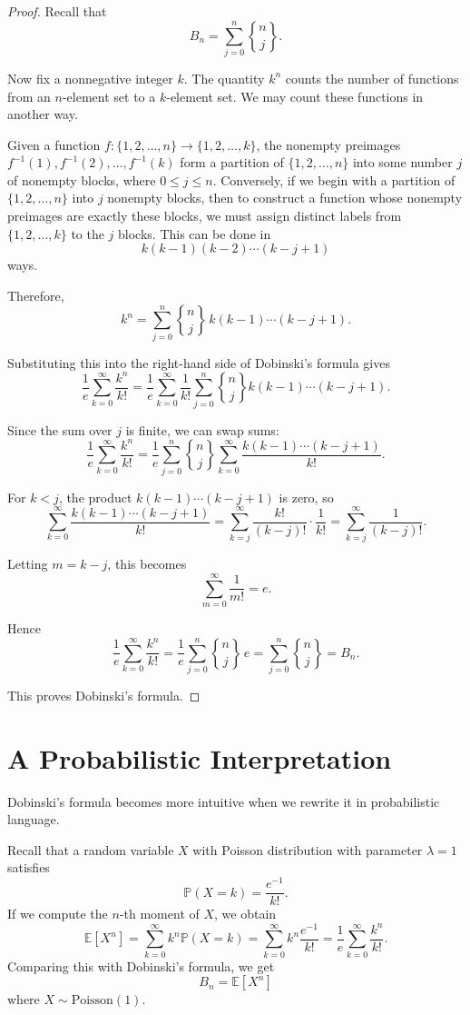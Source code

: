 \documentclass[12pt]{amsart}
\theoremstyle{plain}
\theoremstyle{definition}
\theoremstyle{remark}
\newcommand{\PP}{\mathbb{P}}
\newcommand{\EE}{\mathbb{E}}
\begin{document}
\begin{proof}
Recall that
$$B_n = \sum_{j = 0}^n {n \brace j}.$$

Now fix a nonnegative integer $k$. The quantity $k^n$ counts the number of functions from an $n$-element set to a $k$-element set. We may count these functions in another way.

Given a function $f : \{1, 2, \dots, n\} \to \{1, 2, \dots, k\}$, the nonempty preimages $f^{-1}(1), f^{-1}(2), \dots, f^{-1}(k)$ form a partition of $\{1, 2, \dots, n\}$ into some number $j$ of nonempty blocks, where $0 \le j \le n$. Conversely, if we begin with a partition of $\{1, 2, \dots, n\}$ into $j$ nonempty blocks, then to construct a function whose nonempty preimages are exactly these blocks, we must assign distinct labels from $\{1, 2, \dots, k\}$ to the $j$ blocks. This can be done in
$$k(k-1)(k-2)\cdots(k-j+1)$$
ways.

Therefore,
$$k^n = \sum_{j=0}^n {n \brace j}\,k(k-1)\cdots(k-j+1).$$

Substituting this into the right-hand side of Dobinski's formula gives
$$\frac{1}{e}\sum_{k = 0}^\infty \frac{k^n}{k!} = \frac{1}{e}\sum_{k = 0}^\infty \frac{1}{k!}\sum_{j = 0}^n {n \brace j} k(k-1) \cdots (k-j+1).$$

Since the sum over $j$ is finite, we can swap sums:
$$\frac{1}{e}\sum_{k = 0}^\infty \frac{k^n}{k!} = \frac{1}{e}\sum_{j = 0}^n {n \brace j}\sum_{k = 0}^\infty \frac{k(k-1) \cdots (k - j + 1)}{k!}.$$

For $k < j$, the product $k(k-1)\cdots(k-j+1)$ is zero, so
$$\sum_{k = 0}^\infty \frac{k(k - 1)\cdots(k - j + 1)}{k!} = \sum_{k = j}^\infty \frac{k!}{(k - j)!}\cdot\frac{1}{k!} = \sum_{k = j}^\infty \frac{1}{(k - j)!}.$$

Letting $m = k - j$, this becomes
$$\sum_{m=0}^\infty \frac{1}{m!} = e.$$

Hence
$$\frac{1}{e}\sum_{k=0}^\infty \frac{k^n}{k!} = \frac{1}{e}\sum_{j=0}^n {n \brace j}\,e = \sum_{j=0}^n {n \brace j} = B_n.$$

This proves Dobinski's formula.
\end{proof}

\section{A Probabilistic Interpretation}
Dobinski’s formula becomes more intuitive when we rewrite it in probabilistic language.

Recall that a random variable $X$ with Poisson distribution with parameter $\lambda = 1$ satisfies
$$\PP(X = k) = \frac{e^{-1}}{k!}.$$
If we compute the $n$-th moment of $X$, we obtain
$$\EE[X^n] = \sum_{k = 0}^\infty k^n \PP(X = k) = \sum_{k = 0}^\infty k^n \frac{e^{-1}}{k!} = \frac{1}{e}\sum_{k = 0}^\infty \frac{k^n}{k!}.$$
Comparing this with Dobinski's formula, we get
$$B_n = \EE[X^n]$$
where $X \sim \text{Poisson}(1)$.
\end{document}
